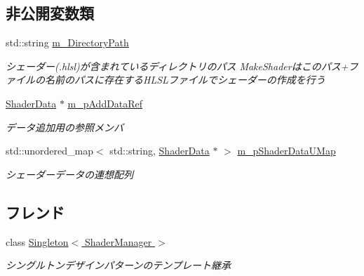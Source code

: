 \subsection*{非公開変数類}
\begin{DoxyCompactItemize}
\item 
std\+::string \hyperlink{class_d3_d11_1_1_graphic_1_1_shader_manager_a6db27edfd24d67c38ce9d0d3d3903c97}{m\+\_\+\+Directory\+Path}\hypertarget{class_d3_d11_1_1_graphic_1_1_shader_manager_a6db27edfd24d67c38ce9d0d3d3903c97}{}\label{class_d3_d11_1_1_graphic_1_1_shader_manager_a6db27edfd24d67c38ce9d0d3d3903c97}

\begin{DoxyCompactList}\small\item\em シェーダー(.hlsl)が含まれているディレクトリのパス  Make\+Shaderはこのパス+ファイルの名前のパスに存在する\+H\+L\+S\+Lファイルでシェーダーの作成を行う \end{DoxyCompactList}\item 
\hyperlink{struct_d3_d11_1_1_graphic_1_1_shader_data}{Shader\+Data} $\ast$ \hyperlink{class_d3_d11_1_1_graphic_1_1_shader_manager_a0ea8d31a9751d1cae5e578665a53868f}{m\+\_\+p\+Add\+Data\+Ref}\hypertarget{class_d3_d11_1_1_graphic_1_1_shader_manager_a0ea8d31a9751d1cae5e578665a53868f}{}\label{class_d3_d11_1_1_graphic_1_1_shader_manager_a0ea8d31a9751d1cae5e578665a53868f}

\begin{DoxyCompactList}\small\item\em データ追加用の参照メンバ \end{DoxyCompactList}\item 
std\+::unordered\+\_\+map$<$ std\+::string, \hyperlink{struct_d3_d11_1_1_graphic_1_1_shader_data}{Shader\+Data} $\ast$ $>$ \hyperlink{class_d3_d11_1_1_graphic_1_1_shader_manager_a4fe3ad1dce5bc1d7d5169ebb4e6bb975}{m\+\_\+p\+Shader\+Data\+U\+Map}\hypertarget{class_d3_d11_1_1_graphic_1_1_shader_manager_a4fe3ad1dce5bc1d7d5169ebb4e6bb975}{}\label{class_d3_d11_1_1_graphic_1_1_shader_manager_a4fe3ad1dce5bc1d7d5169ebb4e6bb975}

\begin{DoxyCompactList}\small\item\em シェーダーデータの連想配列 \end{DoxyCompactList}\end{DoxyCompactItemize}
\subsection*{フレンド}
\begin{DoxyCompactItemize}
\item 
class \hyperlink{class_d3_d11_1_1_graphic_1_1_shader_manager_af5133f3fc6a5b6505ff2999082634c07}{Singleton$<$ Shader\+Manager $>$}\hypertarget{class_d3_d11_1_1_graphic_1_1_shader_manager_af5133f3fc6a5b6505ff2999082634c07}{}\label{class_d3_d11_1_1_graphic_1_1_shader_manager_af5133f3fc6a5b6505ff2999082634c07}

\begin{DoxyCompactList}\small\item\em シングルトンデザインパターンのテンプレート継承 \end{DoxyCompactList}\end{DoxyCompactItemize}
